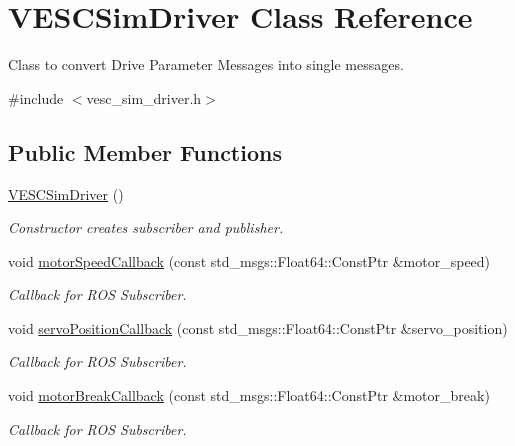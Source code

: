 \hypertarget{class_v_e_s_c_sim_driver}{}\section{V\+E\+S\+C\+Sim\+Driver Class Reference}
\label{class_v_e_s_c_sim_driver}


Class to convert Drive Parameter Messages into single messages.  




{\ttfamily \#include $<$vesc\+\_\+sim\+\_\+driver.\+h$>$}

\subsection*{Public Member Functions}
\begin{DoxyCompactItemize}
\item 
\hyperlink{class_v_e_s_c_sim_driver_a3b2c2842a1d615f61c5edfa9664e41aa}{V\+E\+S\+C\+Sim\+Driver} ()
\begin{DoxyCompactList}\small\item\em Constructor creates subscriber and publisher. \end{DoxyCompactList}\item 
void \hyperlink{class_v_e_s_c_sim_driver_aa58a4f3eb424361ea401e3511e5cce99}{motor\+Speed\+Callback} (const std\+\_\+msgs\+::\+Float64\+::\+Const\+Ptr \&motor\+\_\+speed)
\begin{DoxyCompactList}\small\item\em Callback for R\+OS Subscriber. \end{DoxyCompactList}\item 
void \hyperlink{class_v_e_s_c_sim_driver_ae40a1445ec27ea21923f011b594f6ef3}{servo\+Position\+Callback} (const std\+\_\+msgs\+::\+Float64\+::\+Const\+Ptr \&servo\+\_\+position)
\begin{DoxyCompactList}\small\item\em Callback for R\+OS Subscriber. \end{DoxyCompactList}\item 
void \hyperlink{class_v_e_s_c_sim_driver_acb0a56fef66759254790949f4f689a29}{motor\+Break\+Callback} (const std\+\_\+msgs\+::\+Float64\+::\+Const\+Ptr \&motor\+\_\+break)
\begin{DoxyCompactList}\small\item\em Callback for R\+OS Subscriber. \end{DoxyCompactList}\end{DoxyCompactItemize}


